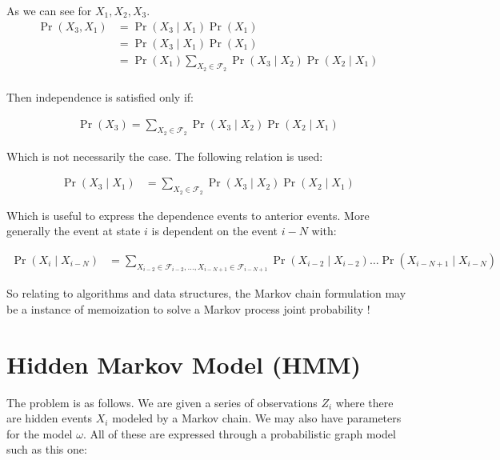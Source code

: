 \documentclass{article}
\begin{document}
As we can see for $X_1, X_2, X_3$.
\begin{align*}
	\Pr( X_3, X_1 ) &= \Pr( X_3 \mid X_1 ) \Pr(X_1)\\
	&= \Pr( X_3 \mid X_1 ) \Pr(X_1)\\
	&= \Pr(X_1) \sum_{X_2\in \mathcal{F}_2}\Pr( X_3 \mid X_2 ) \Pr( X_2 \mid X_1 ) \\
\end{align*}

Then independence is satisfied only if:

\begin{align*}
\Pr(X_3) = \sum_{X_2\in \mathcal{F}_2}\Pr( X_3 \mid X_2 ) \Pr( X_2 \mid X_1 )
\end{align*}

Which is not necessarily the case.
The following relation is used:

\begin{align*}
	\Pr( X_3 \mid X_1 ) &= \sum_{X_2\in \mathcal{F}_2}\Pr( X_3 \mid X_2 ) \Pr( X_2 \mid X_1 ) 
\end{align*}

Which is useful to express the dependence events to anterior events. More generally the event at state $i$ is dependent on the event $i-N$ with:

\begin{align*}
	\Pr( X_i \mid X_{i-N} ) &= \sum_{X_{i-2}\in \mathcal{F}_{i-2}, \dots, X_{i-N+1}\in \mathcal{F}_{i-N+1}}\Pr( X_{i-2} \mid X_{i-2} )\dots \Pr( X_{i-N+1} \mid X_{i-N} )
\end{align*}

So relating to algorithms and data structures,  the Markov chain formulation may be a instance of memoization to solve a Markov process joint probability !

\newpage
\section{Hidden Markov Model (HMM)}

The problem is as follows. We are given a series of observations $Z_i$ where there are hidden events $X_i$ modeled by a Markov chain. We may also have parameters for the model $\omega$. All of these are expressed through a probabilistic graph model such as this one:
\end{document}
